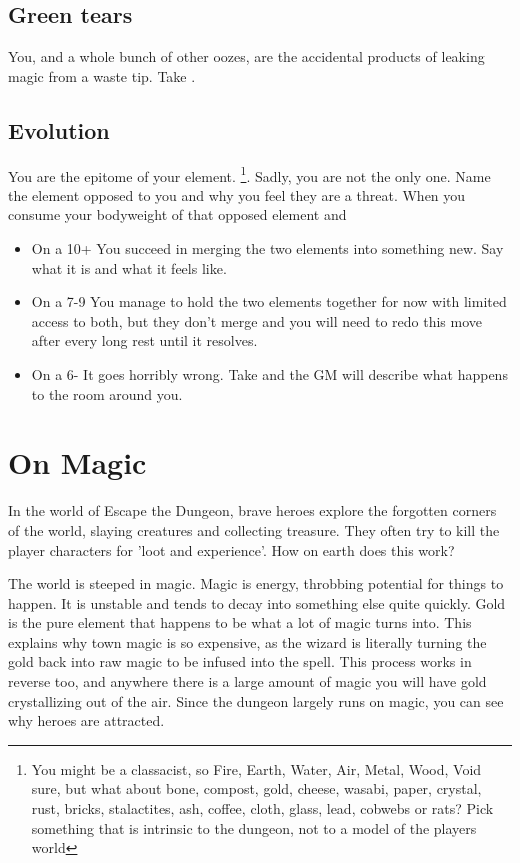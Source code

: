 \documentclass{tufte-book}
\begin{document}
\section{ Green tears} 
You, and a whole bunch of other oozes, are the accidental products of leaking magic from a waste tip. Take .

\section{Evolution} 
You are the epitome of your element. \footnote{You might be a classacist, so Fire, Earth, Water, Air, Metal, Wood, Void sure, but what about bone, compost, gold, cheese, wasabi, paper, crystal, rust, bricks, stalactites, ash, coffee, cloth, glass, lead, cobwebs or rats? Pick something that is intrinsic to the dungeon, not to a model of the players world }. Sadly, you are not the only one. Name the element opposed to you and why you feel they are a threat.
When you consume your bodyweight of that opposed element  and 
\begin{itemize}
\item On a 10+ You succeed in merging the two elements into something new. Say what it is and what it feels like.
\item On a 7-9 You manage to hold the two elements together for now with limited access to both, but they don't merge and you will need to redo this move after every long rest until it resolves.
\item On a 6- It goes horribly wrong. Take  and the GM will describe what happens to the room around you.
 \end{itemize}

\chapter{On Magic}

In the world of Escape the Dungeon, brave heroes explore the forgotten corners of the world, slaying creatures and collecting treasure.  They often try to kill the player characters for 'loot and experience'. How on earth does this work?

The world is steeped in magic. Magic is energy, throbbing potential for things to happen. It is unstable and tends to decay into something else quite quickly. Gold is the pure element that happens to be what a lot of magic turns into. This explains why town magic is so expensive, as the wizard is literally turning the gold back into raw magic to be infused into the spell. This process works in reverse too, and anywhere there is a large amount of magic you will have gold crystallizing out of the air. Since the dungeon largely runs on magic, you can see why heroes are attracted.
\end{document}
